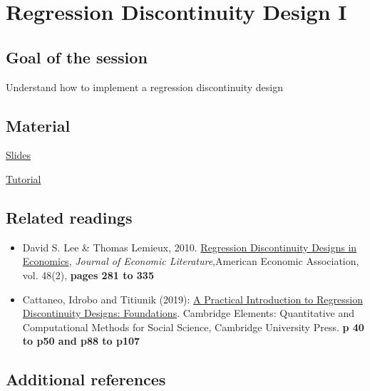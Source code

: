 \documentclass[a4paper,french,11pt]{article}
\begin{document}
\section{Regression Discontinuity Design I }

\subsection*{Goal of the session}
Understand how to implement a regression discontinuity design

\subsection*{Material}
\href{https://drive.google.com/file/d/1pmKzG96bdtQOGU45Wa09zPYIWUIc1JS_/view}{Slides}

\href{https://drive.google.com/file/d/1XVn5QBkIeNRYkiLOTeBSfEalr5Iy5ngp/view}{Tutorial}

\subsection*{Related readings}
\begin{itemize}
  \item David S. Lee \& Thomas Lemieux, 2010. \href{https://drive.google.com/open?id=1FJiN_YSZH52cWtqsGiQjgG7go8Gdeuky}{Regression Discontinuity Designs in Economics}, \textit{Journal of Economic Literature},American Economic Association, vol. 48(2), \textbf{pages 281 to 335}

\item Cattaneo, Idrobo and Titiunik (2019): \href{https://drive.google.com/file/d/11oKBeMhaS0dvEI03okyuMYDllMhLfRyH/view?usp=sharing}{A Practical Introduction to Regression Discontinuity Designs: Foundations}. Cambridge Elements: Quantitative and Computational Methods for Social Science, Cambridge University Press.
\textbf{p 40 to p50 and p88 to p107}

  
\end{itemize}



\subsection*{Additional references}
\end{document}
